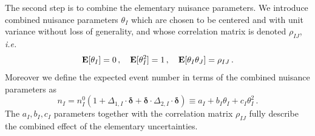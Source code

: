 \documentclass[11pt]{article}
\newcommand{\be}{\begin{equation}}
\newcommand{\ee}{\end{equation}}
\begin{document}

The second step is to combine the elementary nuisance parameters. We introduce combined nuisance parameters $\theta_I$ which  are chosen to be centered and with unit variance without loss of generality, and whose correlation matrix  is denoted $\rho_{IJ}$, \textit{i.e.}
\be
 {\bf E}[\theta_I]=0\,, \quad{\bf E}[\theta^2_I]=1\,,\quad{\bf E}[\theta_I \theta_J]=\rho_{IJ}\,.
\ee
Moreover we define the expected event number in terms of the combined nuisance parameters as
\be
n_I=n^{0}_{I}(1+\Delta_{1,I}\cdot\boldsymbol{\delta}+\boldsymbol{\delta}\cdot\Delta_{2,I}\cdot\boldsymbol{\delta}) \equiv
a_I+b_{I}\theta_I+ c_I\theta_I^2 \label{eq:comb_def}\,.
\ee
The $a_I, b_I, c_I$ parameters together with  the correlation matrix $\rho_{IJ}$ fully describe the combined effect of the elementary uncertainties.
\end{document}
